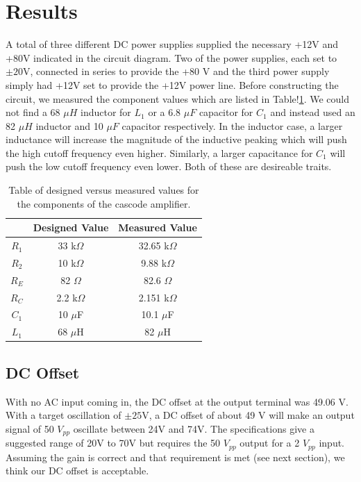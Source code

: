 \documentclass[12pt,letterpaper]{report}
\begin{document}
\section*{Results}

A total of three different DC power supplies supplied the necessary +12V and +80V indicated in the circuit diagram. Two of the power supplies, each set to $\pm 20$V, connected in series to provide the +80 V and the third power supply simply had +12V set to provide the +12V power line. Before constructing the circuit, we measured the component values which are listed in Table!\ref{tab:values}. We could not find a 68 $\mu H$ inductor for $L_1$ or a 6.8 $\mu F$ capacitor for $C_1$ and instead used an 82 $\mu H$ inductor and 10 $\mu F$ capacitor respectively. In the inductor case, a larger inductance will increase the magnitude of the inductive peaking which will push the high cutoff frequency even higher. Similarly, a larger capacitance for $C_1$ will push the low cutoff frequency even lower. Both of these are desireable traits. 

\begin{table}[H]
\centering
\begin{tabular}{|c|c|c|}
	\hline
	 & Designed Value & Measured Value \\
	\hline
	$R_1$ & 33 k$\Omega$ & 32.65 k$\Omega$\\
	\hline
	$R_2$ & 10 k$\Omega$ & 9.88 k$\Omega$ \\
	\hline
	$R_E$ & 82 $\Omega$ & 82.6 $\Omega$ \\
	\hline
	$R_C$ & 2.2 k$\Omega$ & 2.151 k$\Omega$ \\
	\hline
	$C_1$ & 10 $\mu$F & 10.1 $\mu$F \\
	\hline
	$L_1$ & 68 $\mu$H & 82 $\mu$H \\
	\hline
\end{tabular}
\caption{Table of designed versus measured values for the components of the cascode amplifier.}
\label{tab:values}
\end{table}

\subsection*{DC Offset}
With no AC input coming in, the DC offset at the output terminal was 49.06 V. With a target oscillation of $\pm 25$V, a DC offset of about 49 V will make an output signal of 50 $V_{pp}$ oscillate between 24V and 74V. The specifications give a suggested range of 20V to 70V but requires the 50 $V_{pp}$ output for a 2 $V_{pp}$ input. Assuming the gain is correct and that requirement is met (see next section), we think our DC offset is acceptable.
\end{document}
